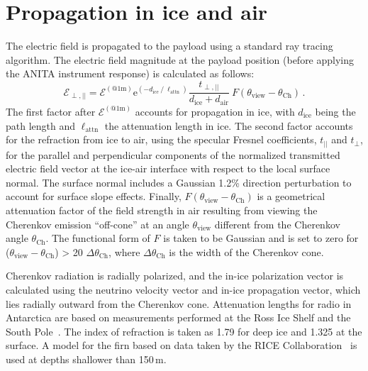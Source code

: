 \section{Propagation in ice and air}
\label{sec:propagation}



The electric field is propagated to the payload using a standard ray tracing algorithm.
The electric field magnitude at the payload position (before applying
the ANITA instrument response) is calculated as follows:
\begin{equation}
 \mathcal{E}_{\perp,||} = \mathcal{E}^{(\mathrm{@ 1m})}  
 \mathrm{e}^{(-d_{\mathrm{ice}}\ /\ \ell_{\mathrm{attn}})}
 \frac{t_{\perp,||}}{d_{\mathrm{ice}} + d_{\mathrm{air}}}
 \ F(\theta_{\mathrm{view}}-\theta_{\mathrm{Ch}}) \,.
\end{equation}
The first factor after $\mathcal{E}^{(\mathrm{@ 1m})}$ accounts for propagation in ice, with $d_{\mathrm{ice}}$ being the path length and $\ell_{\mathrm{attn}}$ the attenuation length in ice. 
The second factor accounts for the refraction from ice to air, using
the specular Fresnel coefficients, $t_{||}$ and $t_{\perp}$, for the parallel and perpendicular components of the normalized transmitted electric field vector at the ice-air interface with respect to the local surface normal.
The surface normal includes a Gaussian 1.2\% direction perturbation to account for surface slope effects.
Finally, $F(\theta_{\mathrm{view}}-\theta_{\mathrm{Ch}})$ is a geometrical attenuation factor of the field strength in air resulting from viewing the Cherenkov emission ``off-cone'' at an angle $\theta_{\mathrm{view}}$ different from the Cherenkov angle $\theta_{\mathrm{Ch}}$.
The functional form of $F$ is taken to be Gaussian and is set to zero for ($\theta_{\mathrm{view}}-\theta_{\mathrm{Ch}}$) > 20 $\Delta \theta_{\mathrm{Ch}}$, where $\Delta \theta_{\mathrm{Ch}}$ is the width of the Cherenkov cone. 


Cherenkov radiation is radially polarized, and the in-ice polarization vector is calculated using the neutrino velocity vector and in-ice propagation vector, which lies radially outward from the Cherenkov cone.
Attenuation lengths for radio in Antarctica are based on measurements performed at the Ross Ice Shelf and the South Pole~\cite{smex}.
The index of refraction is taken as 1.79 for deep ice and 1.325 at the surface. A model for the firn based on data taken by the RICE Collaboration~\cite{PhysRevD.73.082002} is used at depths shallower than 150\,m.


